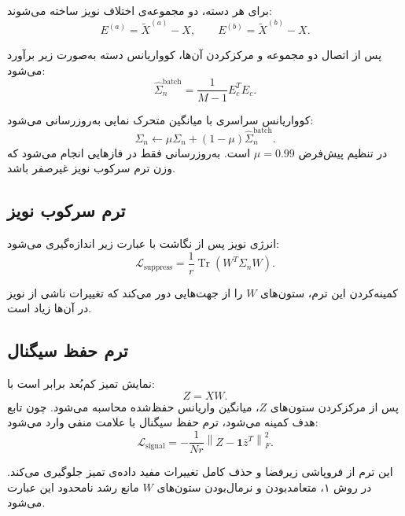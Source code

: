 \documentclass[a4paper,12pt]{article}
\newcommand{\Nterm}{\lr{N}}
\newcommand{\Sterm}{\lr{S}}
\begin{document}
برای هر دسته، دو مجموعه‌ی اختلاف نویز ساخته می‌شوند:
\begin{equation}
 E^{(a)}=\widetilde{X}^{(a)}-X,
 \qquad
 E^{(b)}=\widetilde{X}^{(b)}-X.
\end{equation}

پس از اتصال دو مجموعه و مرکزکردن آن‌ها، کوواریانس دسته به‌صورت زیر برآورد می‌شود:
\begin{equation}
 \widehat{\Sigma}_{n}^{\mathrm{batch}}
 =
 \frac{1}{M-1}E_c^{T}E_c.
\end{equation}

کوواریانس سراسری با میانگین متحرک نمایی به‌روزرسانی می‌شود:
\begin{equation}
 \Sigma_n
 \leftarrow
 \mu\Sigma_n
 +(1-\mu)\widehat{\Sigma}_{n}^{\mathrm{batch}}.
\end{equation}
در تنظیم پیش‌فرض $\mu=0.99$ است. به‌روزرسانی فقط در فازهایی انجام می‌شود که وزن ترم سرکوب نویز غیرصفر باشد.

\subsection{ترم سرکوب نویز \Nterm{}}

انرژی نویز پس از نگاشت با عبارت زیر اندازه‌گیری می‌شود:
\begin{equation}
 \mathcal{L}_{\mathrm{suppress}}
 =
 \frac{1}{r}
 \operatorname{Tr}\!\left(W^{T}\Sigma_nW\right).
\end{equation}

کمینه‌کردن این ترم، ستون‌های $W$ را از جهت‌هایی دور می‌کند که تغییرات ناشی از نویز در آن‌ها زیاد است.

\subsection{ترم حفظ سیگنال \Sterm{}}

نمایش تمیز کم‌بُعد برابر است با:
\begin{equation}
 Z=XW.
\end{equation}
پس از مرکزکردن ستون‌های $Z$، میانگین واریانس حفظ‌شده محاسبه می‌شود. چون تابع هدف کمینه می‌شود، ترم حفظ سیگنال با علامت منفی وارد می‌شود:
\begin{equation}
 \mathcal{L}_{\mathrm{signal}}
 =
 -\frac{1}{Nr}
 \left\|Z-\mathbf{1}\bar{z}^{T}\right\|_{F}^{2}.
\end{equation}

این ترم از فروپاشی زیرفضا و حذف کامل تغییرات مفید داده‌ی تمیز جلوگیری می‌کند. در روش ۱، متعامدبودن و نرمال‌بودن ستون‌های $W$ مانع رشد نامحدود این عبارت می‌شود.
\end{document}
